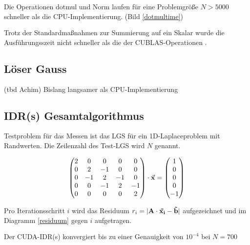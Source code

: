 \documentclass[journal]{IEEEtran}
\begin{document}
Die Operationen dotmul und Norm laufen für eine Problemgröße $N > 5000$ schneller
als die CPU-Implementierung. (Bild \ref{dotmultime})

Trotz der Standardmaßnahmen \cite{reduction} zur Summierung auf ein Skalar wurde
die Ausführungsszeit nicht schneller als die der CUBLAS-Operationen \cite{cublas}.



\subsection{Löser Gauss}

(tbd Achim) Bislang langsamer als CPU-Implementierung

\subsection{IDR(s) Gesamtalgorithmus}

Testproblem für das Messen ist das LGS für ein 1D-Laplaceproblem mit Randwerten.
Die Zeilenzahl des Test-LGS wird $N$ genannt.

\begin{displaymath}
  \begin{pmatrix}
      2 &  0  &  0  & 0   & 0 \\
      0 &  2  & -1  & 0   & 0 \\
      0 & -1  &  2  & -1  & 0 \\
      0 &  0  &  -1  &  2 & -1 \\
      0 &  0  &  0   &  0 & 2  \\
  \end{pmatrix}
   \cdot \vec{ \bf{x} }
   =
  \begin{pmatrix} 1 \\ 0  \\ 0 \\ 0  \\ -1
  \end{pmatrix}
\end{displaymath}


Pro Iterationsschritt $i$ wird das Residuum $r_i = | \bf{A} \cdot \vec{\bf{x_i}} - \vec{b} |$ aufgezeichnet und
im Diagramm \ref{residuum}  gegen $i$ aufgetragen.

Der CUDA-IDR(s) konvergiert bis zu einer Genauigkeit von $10^{-4}$ bei $N=700$
\end{document}
